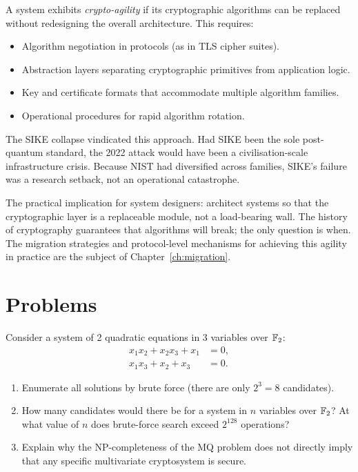 \begin{definition}
\label{def:crypto-agility}
A system exhibits \emph{crypto-agility} if its cryptographic algorithms can be replaced without redesigning the overall architecture.  This requires:
\begin{itemize}
\item Algorithm negotiation in protocols (as in TLS cipher suites).
\item Abstraction layers separating cryptographic primitives from application logic.
\item Key and certificate formats that accommodate multiple algorithm families.
\item Operational procedures for rapid algorithm rotation.
\end{itemize}
\end{definition}

The SIKE collapse vindicated this approach.  Had SIKE been the sole post-quantum standard, the 2022 attack would have been a civilisation-scale infrastructure crisis.  Because NIST had diversified across families, SIKE's failure was a research setback, not an operational catastrophe.

The practical implication for system designers: architect systems so that the cryptographic layer is a replaceable module, not a load-bearing wall.  The history of cryptography guarantees that algorithms will break; the only question is when.  The migration strategies and protocol-level mechanisms for achieving this agility in practice are the subject of Chapter~\ref{ch:migration}.


\section*{Problems}

\begin{prob}
\label{prob:ch11-mq}
Consider a system of 2 quadratic equations in 3 variables over $\mathbb{F}_2$:
\begin{align*}
x_1 x_2 + x_2 x_3 + x_1 &= 0, \\
x_1 x_3 + x_2 + x_3 &= 0.
\end{align*}
\begin{enumerate}
\item[(a)] Enumerate all solutions by brute force (there are only $2^3 = 8$ candidates).
\item[(b)] How many candidates would there be for a system in $n$ variables over $\mathbb{F}_2$?  At what value of $n$ does brute-force search exceed $2^{128}$ operations?
\item[(c)] Explain why the NP-completeness of the MQ problem does not directly imply that any specific multivariate cryptosystem is secure.
\end{enumerate}
\end{prob}

